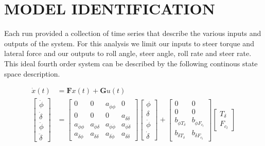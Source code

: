 \documentclass[twocolumn,10pt]{asme2e}
\begin{document}
\section*{MODEL IDENTIFICATION}
Each run provided a collection of time series that describe the various inputs
and outputs of the system. For this analysis we limit our inputs to steer
torque and lateral force and our outputs to roll angle, steer angle, roll rate
and steer rate. This ideal fourth order system can be described by the
following continous state space description.

\begin{equation}
	\begin{split}
		\dot{x}(t) & =
		\mathbf{F}x(t) + \mathbf{G}u(t)\\
		\begin{bmatrix}
			\dot{\phi} \\
			\dot{\delta} \\
			\ddot{\phi} \\
			\ddot{\delta}
		\end{bmatrix}
		& =
		\begin{bmatrix}
			0 & 0 & a_{\dot{\phi}\phi} & 0\\
			0 & 0 & 0 & a_{\dot{\delta}\delta}\\
			a_{\ddot{\phi}\phi} & a_{\ddot{\phi}\delta} &
			a_{\ddot{\phi}\dot{\phi}} & a_{\ddot{\phi}\dot{\delta}}\\
			a_{\ddot{\delta}\phi} & a_{\ddot{\delta}\delta} &
			a_{\ddot{\delta}\dot{\phi}} & a_{\ddot{\delta}\dot{\delta}}
		\end{bmatrix}
		\begin{bmatrix}
			\phi \\
			\delta \\
			\dot{\phi} \\
			\dot{\delta}
		\end{bmatrix}
		+
		\begin{bmatrix}
			0 & 0 \\
			0 & 0\\
			b_{\ddot{\phi}T_\delta} & b_{\ddot{\phi}F_{c_l}}\\
			b_{\ddot{\delta}T_\delta} & b_{\ddot{\delta}F_{c_l}}
		\end{bmatrix}
		\begin{bmatrix}
			T_\delta\\
			F_{c_l}
		\end{bmatrix}
	\end{split}
\end{equation}
\end{document}
